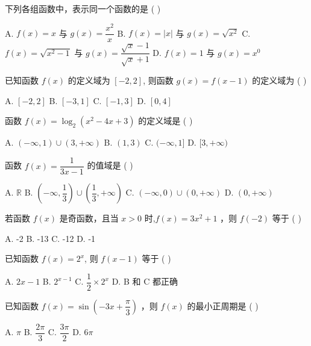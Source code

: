 \documentclass[11pt, a4paper]{article}
\begin{document}
\begin{baitap}[6]
下列各组函数中，表示同一个函数的是 ( )
\par\vspace{3pt}
\noindent A. $f(x) = x$ 与 $g(x) = \dfrac{x^2}{x}$ \quad B. $f(x) = |x|$ 与 $g(x) = \sqrt{x^2}$ \quad C. $f(x) = \sqrt{x^2 - 1}$ 与 $g(x) = \dfrac{\sqrt{x} - 1}{\sqrt{x} + 1}$ \quad D. $f(x) = 1$ 与 $g(x) = x^0$
\end{baitap}

\begin{baitap}[7]
已知函数 $f(x)$ 的定义域为 $[-2,2]$, 则函数 $g(x) = f(x - 1)$ 的定义域为 ( )
\par\vspace{3pt}
\noindent A. $[-2,2]$ \quad B. $[-3,1]$ \quad C. $[-1,3]$ \quad D. $[0,4]$
\end{baitap}

\begin{baitap}[8]
函数 $f(x) = \log_{2}(x^2 - 4x + 3)$ 的定义域是 ( )
\par\vspace{3pt}
\noindent A. $(-\infty, 1) \cup (3, +\infty)$ \quad B. $(1,3)$ \quad C. $(-\infty, 1]$ \quad D. $[3, +\infty)$
\end{baitap}

\begin{baitap}[9]
函数 $f(x) = \dfrac{1}{3x-1}$ 的值域是 ( )
\par\vspace{3pt}
\noindent A. $\mathbb{R}$ \quad B. $\left(-\infty, \dfrac{1}{3}\right) \cup \left(\dfrac{1}{3}, +\infty\right)$ \quad C. $(-\infty, 0) \cup (0, +\infty)$ \quad D. $(0, +\infty)$
\end{baitap}

\begin{baitap}[10]
若函数 $f(x)$ 是奇函数，且当 $x > 0$ 时,$f(x) = 3x^2 + 1$ ，则 $f(-2)$ 等于 ( )
\par\vspace{3pt}
\noindent A. -2 \quad B. -13 \quad C. -12 \quad D. -1
\end{baitap}

\begin{baitap}[11]
已知函数 $f(x) = 2^x$, 则 $f(x - 1)$ 等于 ( )
\par\vspace{3pt}
\noindent A. $2x - 1$ \quad B. $2^{x-1}$ \quad C. $\dfrac{1}{2} \times 2^x$ \quad D. B 和 C 都正确
\end{baitap}

\begin{baitap}[12]
已知函数 $f(x) = \sin\!\left(-3x + \dfrac{\pi}{3}\right)$ ，则 $f(x)$ 的最小正周期是 ( )
\par\vspace{3pt}
\noindent A. $\pi$ \quad B. $\dfrac{2\pi}{3}$ \quad C. $\dfrac{3\pi}{2}$ \quad D. $6\pi$
\end{baitap}
\end{document}
